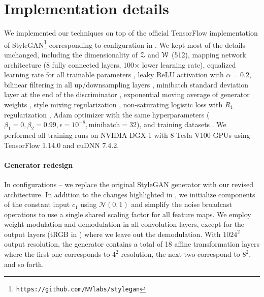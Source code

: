 \section{Implementation details} %
\label{app:implementation}

We implemented our techniques on top of the official TensorFlow implementation of StyleGAN\footnote{\texttt{https://github.com/NVlabs/stylegan}} corresponding to configuration  in .
We kept most of the details unchanged, including
	the dimensionality of $\mathcal{Z}$ and $\mathcal{W}$ (512),
	mapping network architecture (8 fully connected layers, 100$\times$ lower learning rate),
	equalized learning rate for all trainable parameters \cite{Karras2017},
	leaky ReLU activation with $\alpha=0.2$,
	bilinear filtering \cite{zhang2019} in all up/downsampling layers \cite{Karras2018},
	minibatch standard deviation layer at the end of the discriminator \cite{Karras2017},
	exponential moving average of generator weights \cite{Karras2017},
	style mixing regularization \cite{Karras2018},
	non-saturating logistic loss \cite{Goodfellow2014} with $R_1$ regularization \cite{Mescheder2018},
	Adam optimizer \cite{adam} with the same hyperparameters ($\beta_1=0, \beta_2=0.99, \epsilon=10^{-8}, \mathrm{minibatch}=32$),
	and training datasets \cite{Karras2018,LSUN}.
We performed all training runs on NVIDIA DGX-1 with 8 Tesla V100 GPUs using TensorFlow 1.14.0 and cuDNN 7.4.2.

\paragraph{Generator redesign}
In configurations -- we replace the original StyleGAN generator with our revised architecture.
In addition to the changes highlighted in , we initialize components of the constant input $c_1$ using $\mathcal{N}(0,1)$ and simplify the noise broadcast operations to use a single shared scaling factor for all feature maps.
We employ weight modulation and demodulation in all convolution layers, except for the output layers (tRGB in ) where we leave out the demodulation.
With $1024^2$ output resolution, the generator contains a total of 18 affine transformation layers where the first one corresponds to $4^2$ resolution, the next two correspond to $8^2$, and so forth.

